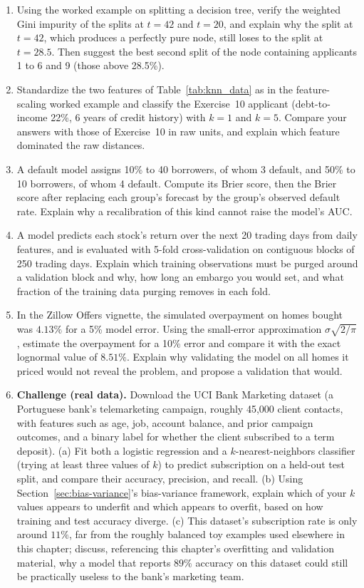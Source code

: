 \documentclass[../ai_in_finance]{subfiles}
\begin{document}
\begin{enumerate}[exercises]
    \item Using the worked example on splitting a decision tree, verify the weighted Gini impurity of the splits at $t = 42$ and $t = 20$, and explain why the split at $t = 42$, which produces a perfectly pure node, still loses to the split at $t = 28.5$. Then suggest the best second split of the node containing applicants 1 to 6 and 9 (those above 28.5\%).
    \item Standardize the two features of Table~\ref{tab:knn_data} as in the feature-scaling worked example and classify the Exercise~10 applicant (debt-to-income 22\%, 6 years of credit history) with $k=1$ and $k=5$. Compare your answers with those of Exercise~10 in raw units, and explain which feature dominated the raw distances.
    \item A default model assigns 10\% to 40 borrowers, of whom 3 default, and 50\% to 10 borrowers, of whom 4 default. Compute its Brier score, then the Brier score after replacing each group's forecast by the group's observed default rate. Explain why a recalibration of this kind cannot raise the model's AUC.
    \item A model predicts each stock's return over the next 20 trading days from daily features, and is evaluated with 5-fold cross-validation on contiguous blocks of 250 trading days. Explain which training observations must be purged around a validation block and why, how long an embargo you would set, and what fraction of the training data purging removes in each fold.
    \item In the Zillow Offers vignette, the simulated overpayment on homes bought was $4.13\%$ for a 5\% model error. Using the small-error approximation $\sigma\sqrt{2/\pi}$, estimate the overpayment for a 10\% error and compare it with the exact lognormal value of $8.51\%$. Explain why validating the model on all homes it priced would not reveal the problem, and propose a validation that would.
    \item \textbf{Challenge (real data).} Download the UCI Bank Marketing dataset (a Portuguese bank's telemarketing campaign, roughly 45,000 client contacts, with features such as age, job, account balance, and prior campaign outcomes, and a binary label for whether the client subscribed to a term deposit). (a) Fit both a logistic regression and a $k$-nearest-neighbors classifier (trying at least three values of $k$) to predict subscription on a held-out test split, and compare their accuracy, precision, and recall. (b) Using Section~\ref{sec:bias-variance}'s bias-variance framework, explain which of your $k$ values appears to underfit and which appears to overfit, based on how training and test accuracy diverge. (c) This dataset's subscription rate is only around $11\%$, far from the roughly balanced toy examples used elsewhere in this chapter; discuss, referencing this chapter's overfitting and validation material, why a model that reports $89\%$ accuracy on this dataset could still be practically useless to the bank's marketing team.
\end{enumerate}
\end{document}

